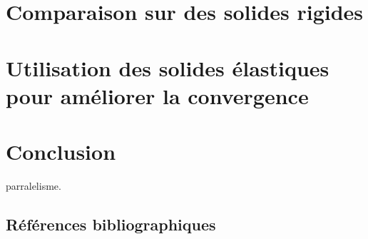 \documentclass{CSMA2017}
\begin{document}
\section{Comparaison sur des solides rigides}

\section{Utilisation des solides élastiques pour améliorer la convergence}

\section{Conclusion}

parralelisme.
\subsection{Références bibliographiques}








\end{document}
